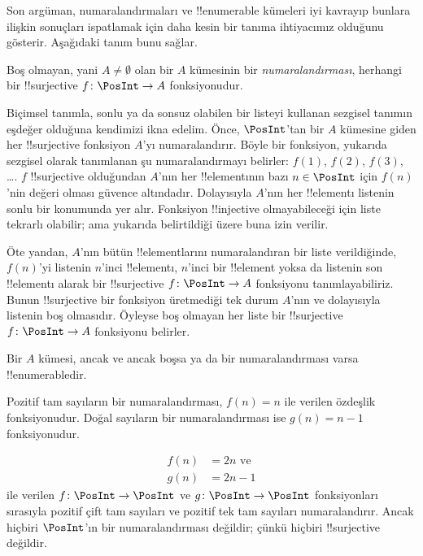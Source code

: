 \documentclass[../../../include/open-logic-section]{subfiles}
\begin{document}
Son argüman, numaralandırmaları ve !!{enumerable} kümeleri iyi kavrayıp
bunlara ilişkin sonuçları ispatlamak için daha kesin bir tanıma ihtiyacımız
olduğunu gösterir. Aşağıdaki tanım bunu sağlar.

\begin{defn}
Boş olmayan, yani $A\neq\emptyset$ olan bir $A$ kümesinin bir
\emph{numaralandırması}, herhangi bir
!!{surjective} $f \colon \PosInt \to A$ fonksiyonudur.
\end{defn}

\begin{explain}
Biçimsel tanımla, sonlu ya da sonsuz olabilen bir listeyi kullanan sezgisel
tanımın eşdeğer olduğuna kendimizi ikna edelim. Önce, $\PosInt$'tan bir $A$
kümesine giden her !!{surjective} fonksiyon $A$'yı numaralandırır. Böyle bir
fonksiyon, yukarıda sezgisel olarak tanımlanan şu numaralandırmayı belirler:
$f(1)$, $f(2)$, $f(3)$, \dots. $f$ !!{surjective} olduğundan $A$'nın her
!!{element}ının bazı $n \in \PosInt$ için $f(n)$'nin değeri olması güvence
altındadır. Dolayısıyla $A$'nın her !!{element}ı listenin sonlu bir konumunda
yer alır. Fonksiyon !!{injective} olmayabileceği için liste tekrarlı olabilir;
ama yukarıda belirtildiği üzere buna izin verilir.

Öte yandan, $A$'nın bütün !!{element}larını numaralandıran bir liste
verildiğinde, $f(n)$'yi listenin $n$'inci !!{element}ı, $n$'inci bir
!!{element} yoksa da listenin son !!{element}ı alarak bir !!{surjective}
$f\colon \PosInt \to A$ fonksiyonu tanımlayabiliriz. Bunun !!{surjective} bir
fonksiyon üretmediği tek durum $A$'nın ve dolayısıyla listenin boş olmasıdır.
Öyleyse boş olmayan her liste bir !!{surjective} $f\colon \PosInt \to A$
fonksiyonu belirler.
\end{explain}

\begin{defn}
  Bir $A$ kümesi, ancak ve ancak boşsa ya da bir numaralandırması varsa
  !!{enumerable}dir.
\end{defn}

\begin{ex}
Pozitif tam sayıların bir numaralandırması, $f(n)=n$ ile verilen özdeşlik
fonksiyonudur. Doğal sayıların bir numaralandırması ise $g(n)=n-1$
fonksiyonudur.
\end{ex}

\begin{ex}
\begin{align*}
f(n) & = 2n \text{ ve}\\
g(n) & = 2n - 1
\end{align*}
ile verilen $f\colon \PosInt \to \PosInt$ ve $g \colon \PosInt \to
\PosInt$ fonksiyonları sırasıyla pozitif çift tam sayıları ve pozitif tek tam
sayıları numaralandırır. Ancak hiçbiri $\PosInt$'ın bir numaralandırması
değildir; çünkü hiçbiri !!{surjective} değildir.
\end{ex}
\end{document}
